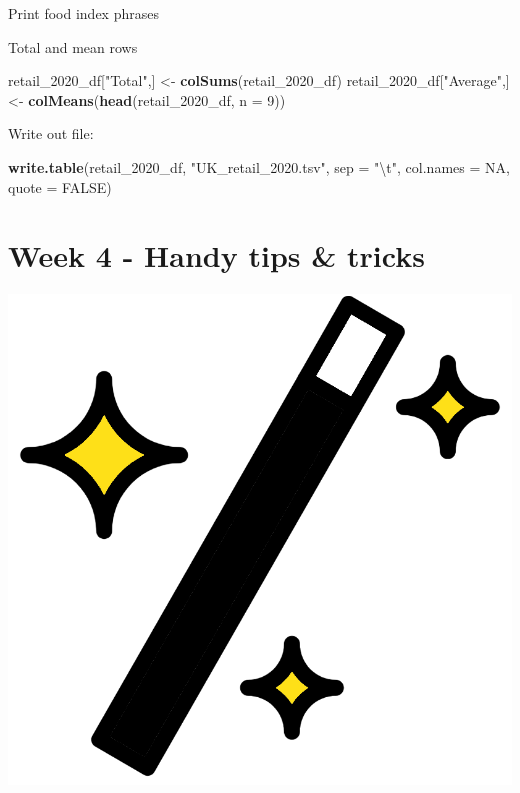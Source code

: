 \documentclass[]{book}
\newenvironment{Shaded}{\begin{snugshade}}{\end{snugshade}}
\newcommand{\KeywordTok}[1]{\textcolor[rgb]{0.13,0.29,0.53}{\textbf{#1}}}
\newcommand{\DataTypeTok}[1]{\textcolor[rgb]{0.13,0.29,0.53}{#1}}
\newcommand{\DecValTok}[1]{\textcolor[rgb]{0.00,0.00,0.81}{#1}}
\newcommand{\CharTok}[1]{\textcolor[rgb]{0.31,0.60,0.02}{#1}}
\newcommand{\StringTok}[1]{\textcolor[rgb]{0.31,0.60,0.02}{#1}}
\newcommand{\OtherTok}[1]{\textcolor[rgb]{0.56,0.35,0.01}{#1}}
\newcommand{\OperatorTok}[1]{\textcolor[rgb]{0.81,0.36,0.00}{\textbf{#1}}}
\newcommand{\NormalTok}[1]{#1}
\begin{document}
Print food index phrases

\begin{Shaded}
\end{Shaded}

Total and mean rows

\begin{Shaded}
\begin{Highlighting}[]
\NormalTok{retail_2020_df[}\StringTok{"Total"}\NormalTok{,] <-}\StringTok{ }\KeywordTok{colSums}\NormalTok{(retail_2020_df)}
\NormalTok{retail_2020_df[}\StringTok{"Average"}\NormalTok{,] <-}\StringTok{ }\KeywordTok{colMeans}\NormalTok{(}\KeywordTok{head}\NormalTok{(retail_2020_df, }\DataTypeTok{n =} \DecValTok{9}\NormalTok{))}
\end{Highlighting}
\end{Shaded}

Write out file:

\begin{Shaded}
\begin{Highlighting}[]
\KeywordTok{write.table}\NormalTok{(retail_2020_df, }\StringTok{"UK_retail_2020.tsv"}\NormalTok{, }
            \DataTypeTok{sep =} \StringTok{"}\CharTok{\textbackslash{}t}\StringTok{"}\NormalTok{, }\DataTypeTok{col.names =} \OtherTok{NA}\NormalTok{, }\DataTypeTok{quote =} \OtherTok{FALSE}\NormalTok{)}
\end{Highlighting}
\end{Shaded}

\chapter{Week 4 - Handy tips \&
tricks}\label{week-4---handy-tips-tricks}

\begin{center}\includegraphics[width=0.2\linewidth]{figures/magic} \end{center}
\end{document}
